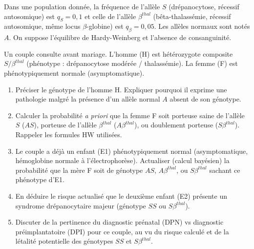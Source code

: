 \documentclass[11pt]{article}
\begin{document}
\begin{exercice}
Dans une population donnée, la fréquence de l'allèle $S$ (drépanocytose, récessif autosomique) est $q_S = 0,1$ et celle de l'allèle $\beta^{thal}$ (bêta-thalassémie, récessif autosomique, même locus $\beta$-globine) est $q_{\beta} = 0,05$. Les allèles normaux sont notés $A$. On suppose l'équilibre de Hardy-Weinberg et l'absence de consanguinité.

Un couple consulte avant mariage. L'homme (H) est hétérozygote composite $S / \beta^{thal}$ (phénotype : drépanocytose modérée / thalassémie). La femme (F) est phénotypiquement normale (asymptomatique).
\begin{enumerate}
    \item Préciser le génotype de l'homme H. Expliquer pourquoi il exprime une pathologie malgré la présence d'un allèle normal $A$ absent de son génotype.
    \item Calculer la probabilité \textit{a priori} que la femme F soit porteuse saine de l'allèle $S$ ($AS$), porteuse de l'allèle $\beta^{thal}$ ($A\beta^{thal}$), ou doublement porteuse ($S\beta^{thal}$). Rappeler les formules HW utilisées.
    \item Le couple a déjà un enfant (E1) phénotypiquement normal (asymptomatique, hémoglobine normale à l'électrophorèse). Actualiser (calcul bayésien) la probabilité que la mère F soit de génotype $AS$, $A\beta^{thal}$, ou $S\beta^{thal}$ sachant ce phénotype d'E1.
    \item En déduire le risque actualisé que le deuxième enfant (E2) présente un syndrome drépanocytaire majeur (génotype $SS$ ou $S\beta^{thal}$).
    \item Discuter de la pertinence du diagnostic prénatal (DPN) vs diagnostic préimplantatoire (DPI) pour ce couple, au vu du risque calculé et de la létalité potentielle des génotypes $SS$ et $S\beta^{thal}$.
\end{enumerate}
\end{exercice}
\end{document}
